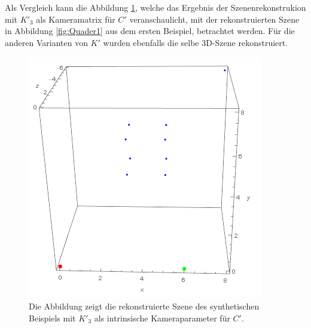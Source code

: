 Als Vergleich kann die Abbildung \ref{fig:reconstructedDifferentResolutions}, welche das Ergebnis der Szenenrekonstrukion mit $K'_3$ als Kameramatrix für $C'$ veranschaulicht, mit der rekonstruierten Szene in Abbildung \ref{fig:Quader1} aus dem ersten Beispiel, betrachtet werden. Für die anderen Varianten von $K'$ wurden ebenfalls die selbe 3D-Szene rekonstruiert.\\ 





\begin{figure}[!htb]
	\centering
	\includegraphics[width=0.5\linewidth]{images/DifferentAufloesungRekonstructedScene.png}
	\caption[Rekonstruierte Szene bei unterschiedlichen Kameraauflösungen]{Die Abbildung zeigt die rekonstruierte Szene des synthetischen Beispiels mit $K'_3$ als intrinsische Kameraparameter für $C'$.} 
	\label{fig:reconstructedDifferentResolutions}
\end{figure}



